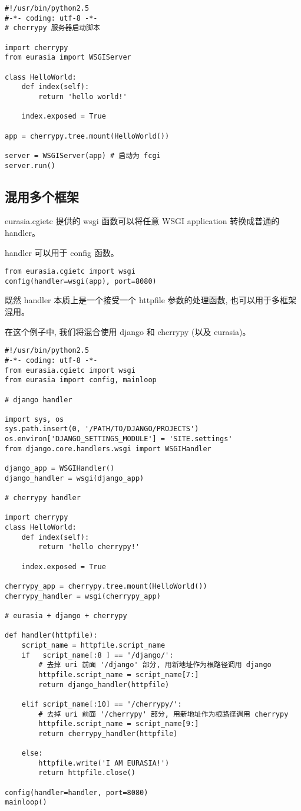 \documentclass{manual}
\begin{document}
\begin{verbatim}
#!/usr/bin/python2.5
#-*- coding: utf-8 -*-
# cherrypy 服务器启动脚本

import cherrypy
from eurasia import WSGIServer

class HelloWorld:
	def index(self):
		return 'hello world!'

	index.exposed = True

app = cherrypy.tree.mount(HelloWorld())

server = WSGIServer(app) # 启动为 fcgi
server.run()
\end{verbatim}

\subsection{混用多个框架}

eurasia.cgietc 提供的 wsgi 函数可以将任意 WSGI application 转换成普通的 handler。

handler 可以用于 config 函数。

\begin{verbatim}
from eurasia.cgietc import wsgi
config(handler=wsgi(app), port=8080)
\end{verbatim}

既然 handler 本质上是一个接受一个 httpfile 参数的处理函数, 也可以用于多框架混用。

在这个例子中, 我们将混合使用 django 和 cherrypy (以及 eurasia)。

\begin{verbatim}
#!/usr/bin/python2.5
#-*- coding: utf-8 -*-
from eurasia.cgietc import wsgi
from eurasia import config, mainloop

# django handler

import sys, os
sys.path.insert(0, '/PATH/TO/DJANGO/PROJECTS')
os.environ['DJANGO_SETTINGS_MODULE'] = 'SITE.settings'
from django.core.handlers.wsgi import WSGIHandler

django_app = WSGIHandler()
django_handler = wsgi(django_app)

# cherrypy handler

import cherrypy
class HelloWorld:
	def index(self):
		return 'hello cherrypy!'

	index.exposed = True

cherrypy_app = cherrypy.tree.mount(HelloWorld())
cherrypy_handler = wsgi(cherrypy_app)

# eurasia + django + cherrypy

def handler(httpfile):
	script_name = httpfile.script_name
	if   script_name[:8 ] == '/django/':
		# 去掉 uri 前面 '/django' 部分, 用新地址作为根路径调用 django
		httpfile.script_name = script_name[7:]
		return django_handler(httpfile)

	elif script_name[:10] == '/cherrypy/':
		# 去掉 uri 前面 '/cherrypy' 部分, 用新地址作为根路径调用 cherrypy
		httpfile.script_name = script_name[9:]
		return cherrypy_handler(httpfile)

	else:
		httpfile.write('I AM EURASIA!')
		return httpfile.close()

config(handler=handler, port=8080)
mainloop()
\end{verbatim}
\end{document}
